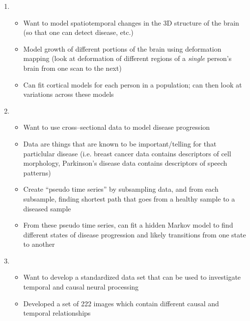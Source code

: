 \documentclass[12pt]{article}
\begin{document}
\begin{enumerate}
\item {}
\begin{itemize}
	\item Want to model spatiotemporal changes in the 3D structure of the brain (so that one can detect disease, etc.)
	\item Model growth of different portions of the brain using deformation mapping (look at deformation of different regions of a {\em single} person's brain from one scan to the next)
	\item Can fit cortical models for each person in a population; can then look at variations across these models
\end{itemize}  

\item {}
\begin{itemize}
	\item Want to use cross--sectional data to model disease progression
	\item Data are things that are known to be important/telling for that particlular disease (i.e. breast cancer data contains descriptors of cell morphology, Parkinson's disease data contains descriptors of speech patterns)
	\item Create ``pseudo time series'' by subsampling data, and from each subsample, finding shortest path that goes from a healthy sample to a diseased sample
	\item From these pseudo time series, can fit a hidden Markov model to find different states of disease progression and likely transitions from one state to another
\end{itemize}

\item {}
\begin{itemize}
	\item Want to develop a standardized data set that can be used to investigate temporal and causal neural processing
	\item Developed a set of 222 images which contain different causal and temporal relationships
\end{itemize}


\end{enumerate}
\end{document}
